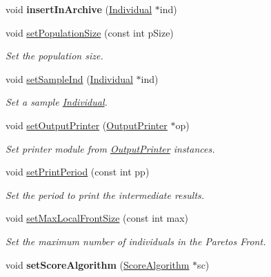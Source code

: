 \begin{DoxyCompactItemize}
\mbox{\label{classEA_a208ac74dea2eaa42e17c19f5e32d644d}} 
void {\bfseries insert\+In\+Archive} (\mbox{\hyperlink{classIndividual}{Individual}} $\ast$ind)
\item 
void \mbox{\hyperlink{classEA_afb4678f700cb03d64dc60fc3d24f7a1f}{set\+Population\+Size}} (const int p\+Size)
\begin{DoxyCompactList}\small\item\em Set the population size. \end{DoxyCompactList}\item 
void \mbox{\hyperlink{classEA_add9a924cd307b2a49b1cf961c65e8ef2}{set\+Sample\+Ind}} (\mbox{\hyperlink{classIndividual}{Individual}} $\ast$ind)
\begin{DoxyCompactList}\small\item\em Set a sample \mbox{\hyperlink{classIndividual}{Individual}}. \end{DoxyCompactList}\item 
void \mbox{\hyperlink{classEA_a49a75271ab62ffdb59d7a5fbbc97f998}{set\+Output\+Printer}} (\mbox{\hyperlink{classOutputPrinter}{Output\+Printer}} $\ast$op)
\begin{DoxyCompactList}\small\item\em Set printer module from \mbox{\hyperlink{classOutputPrinter}{Output\+Printer}} instances. \end{DoxyCompactList}\item 
void \mbox{\hyperlink{classEA_a161b549d8ec90da1bd07687f6b388b59}{set\+Print\+Period}} (const int pp)
\begin{DoxyCompactList}\small\item\em Set the period to print the intermediate results. \end{DoxyCompactList}\item 
void \mbox{\hyperlink{classEA_a114980c167652af030f11349810797e9}{set\+Max\+Local\+Front\+Size}} (const int max)
\begin{DoxyCompactList}\small\item\em Set the maximum number of individuals in the Pareto\textquotesingle{}s Front. \end{DoxyCompactList}\item 
\mbox{\label{classEA_a2140dd732a9acc2ce6044669e60bb335}} 
void {\bfseries set\+Score\+Algorithm} (\mbox{\hyperlink{classScoreAlgorithm}{Score\+Algorithm}} $\ast$sc)
\item 
\mbox{\label{classEA_a7331ed1b01abe48b170068abbde388be}} 

\end{DoxyCompactItemize}
